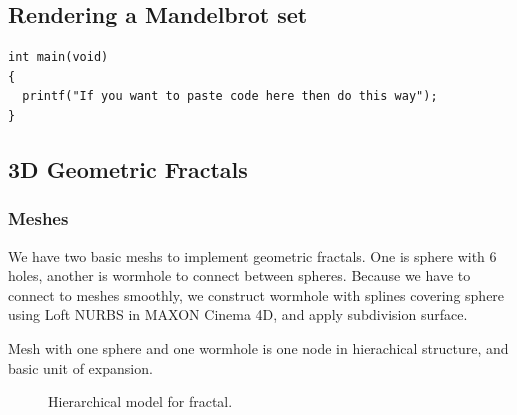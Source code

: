 \documentclass[a4paper]{article}
\begin{document}
\subsection{Rendering a Mandelbrot set}

\begin{lstlisting}[style=CStyle]
int main(void)
{
  printf("If you want to paste code here then do this way");
}
\end{lstlisting}
\subsection{3D Geometric Fractals}
\subsubsection{Meshes}
We have two basic meshs to implement geometric fractals. One is sphere with 6 holes, another is wormhole to connect between spheres. Because we have to connect to meshes smoothly, we construct wormhole with splines covering sphere using Loft NURBS in MAXON Cinema 4D, and apply subdivision surface.

Mesh with one sphere and one wormhole is one node in hierachical structure, and basic unit of expansion.
\begin{figure}[H]
\centering
{}
\caption[1]{Hierarchical model for fractal.}
\end{figure}
\end{document}
